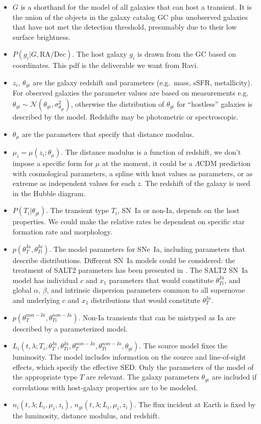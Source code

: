 \documentclass[preprint]{aastex}
\begin{document}
\begin{itemize}
\item $G$ is a shorthand for the model of all galaxies that can host a transient.  It is
the union of the objects in the galaxy catalog GC
plus unobserved galaxies that have not
met the detection threshold, presumably due to their low surface brightness.
\item $P(g_i | G, {\text{RA}}/{\text{Dec}})$. The host galaxy $g_i$
is drawn from the GC based on coordinates.
This pdf is
the deliverable we want from Ravi.
\item $z_i$, $\theta_{gi}$ are the galaxy redshift and parameters (e.g.\ mass, sSFR, metallicity).
For observed galaxies the parameter values are based on measurements e.g.\ $\theta_{gi} \sim \mathcal{N}({\theta}_{gi},\sigma^2_{{\theta}_{gi}})$, otherwise the distribution
of $\theta_{gi}$ for ``hostless'' galaxies is described by the model.
Redshifts may be photometric or spectroscopic.
\item $\theta_\mu$ are the parameters that specify that distance modulus.
\item $\mu_i=\mu(z_i; \theta_\mu)$.  The distance modulus is a function of redshift,
we don't impose a specific form for  $\mu$ at the moment,  it could
be a $\Lambda$CDM prediction with cosmological parameters, a spline with knot values
as parameters, or as extreme as independent values for each $z$.
The redshift of the galaxy is used in the Hubble diagram.
\item $P(T_i | \theta_{gi})$.  The transient type $T_i$, SN~Ia or non-Ia, depends
on the host properties.  We could make the relative rates be dependent
on specific star formation rate and morphology.
\item $p(\theta_T^{Ia}, \theta_{Ti}^{Ia})$.  The model parameters for SNe~Ia, including
parameters that describe distributions.
Different SN~Ia models could be considered: the treatment of SALT2 parameters
has been presented in \citet{2011MNRAS.418.2308M}.
The SALT2 SN~Ia
model has individual $c$ and $x_1$ parameters that would constitute $\theta_{Ti}^{Ia}$,
and global $\alpha$, $\beta$, and intrinsic dispersion  parameters  common to all supernovae
 and  underlying  $c$ and $x_1$ distributions that would constitute $\theta_T^{Ia}$.
\item $p(\theta_T^{non-Ia}, \theta_{Ti}^{non-Ia})$.  Non-Ia transients
that can be mistyped as Ia are described by a parameterized model.
\item $L_i(t,\lambda; T_i, \theta_T^{Ia}, \theta_{Ti}^{Ia}, \theta_T^{non-Ia}, \theta_{Ti}^{non-Ia},
\theta_{gi})$.  The source model fixes
the luminosity. The  model includes  information on the
source and line-of-sight effects, which specify the effective SED.   Only the
parameters of the model of the appropriate type $T$ are relevant.  The galaxy parameters
$\theta_{gi}$ are included if correlations with host-galaxy properties are to be modeled.
\item $n_i(t,\lambda; L_i, \mu_i, z_i)$, $n_{gi}(t,\lambda; L_i, \mu_i, z_i)$.  The  flux incident at Earth
is fixed by the luminosity, distance modulus, and redshift.
\end{itemize}
\end{document}
